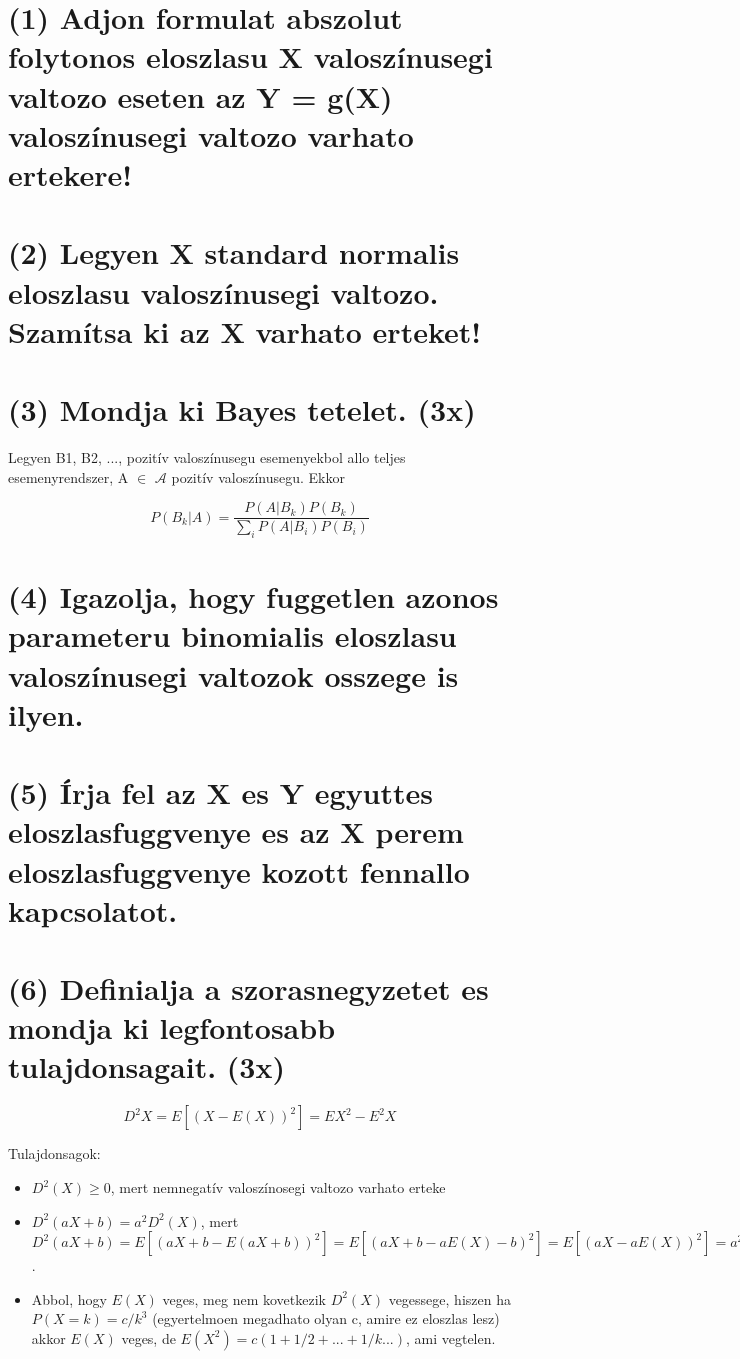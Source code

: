\documentclass[12p]{article}
\begin{document}
\section{(1) Adjon formulat abszolut folytonos eloszlasu X valoszínusegi valtozo eseten az Y = g(X) valoszínusegi valtozo varhato ertekere!}

\section{(2) Legyen X standard normalis eloszlasu valoszínusegi valtozo. Szamítsa ki az X varhato erteket! }

\section{(3) Mondja ki Bayes tetelet. (3x)}

Legyen B1, B2, ..., pozitív valoszínusegu esemenyekbol allo teljes esemenyrendszer, A $\in$ $\mathscr{A}$ pozitív valoszínusegu. Ekkor

$$\displaystyle{P(B_k|A) = \frac{P(A|B_k)P(B_k)}{\displaystyle{\sum_i} P(A|B_i)P(B_i)}}$$

\section{(4) Igazolja, hogy fuggetlen azonos parameteru binomialis eloszlasu valoszínusegi valtozok osszege is ilyen.}

\section{(5) Írja fel az X es Y egyuttes eloszlasfuggvenye es az X perem eloszlasfuggvenye kozott fennallo kapcsolatot.}

\section{(6)  Definialja a szorasnegyzetet es mondja ki legfontosabb tulajdonsagait. (3x)}

$$D^2X = E[(X - E(X))^2] = EX^2 - E^2X$$

Tulajdonsagok:

\begin{itemize}
	\item $D^2(X) \geq 0$, mert nemnegatív valoszínosegi valtozo varhato erteke
	\item $D^2(aX+b)=a^2D^2(X)$, mert $D^2(aX+b)=E[(aX+b-E(aX+b))^2]= E[(aX+b-aE(X)-b)^2]=E[(aX-aE(X))^2]=a^2 E[(X-E(X))^2]$.
	\item Abbol, hogy $E(X)$ veges, meg nem kovetkezik $D^2(X)$ vegessege, hiszen ha $P(X=k)=c/k^3$ (egyertelmoen megadhato olyan c, amire ez eloszlas lesz) akkor $E(X)$ veges, de $E(X^2)=c(1+1/2+...+1/k...)$, ami vegtelen.
\end{itemize}
\end{document}
